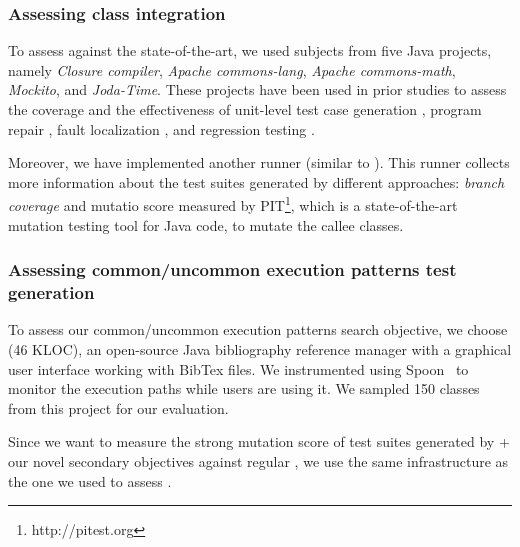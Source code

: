 \subsubsection{Assessing class integration} 
To assess \cling against the state-of-the-art, we used subjects from five Java projects, namely \textit{Closure compiler}, \textit{Apache commons-lang}, \textit{Apache commons-math}, \textit{Mockito}, and \textit{Joda-Time}. These 
projects have been used in prior studies to assess the coverage and the effectiveness of unit-level test case generation \cite{ma2015grt, Panichella2018, just2014defects4j, Shamshiri2016}, program repair \cite{smith2015cure, martinez2016astor}, fault localization \cite{pearson2017evaluating, b2016learning}, and regression testing \cite{noor2015similarity, lu2016does}.

Moreover, we have implemented another runner (similar to \exrunner). This runner collects more information about the test suites generated by different approaches: \textit{branch coverage} and mutatio score measured by PIT\footnote{http://pitest.org}, which is a state-of-the-art mutation testing tool for Java code, to mutate the callee classes.

\subsubsection{Assessing common/uncommon execution patterns test generation} 

To assess our common/uncommon execution patterns search objective, we choose \jabref (46 KLOC), an open-source Java bibliography reference manager with a graphical user interface working with BibTex files. We instrumented \jabref using Spoon~\cite{pawlak:hal-01078532} to monitor the execution paths while users are using it. We sampled 150 classes from this project for our evaluation.

Since we want to measure the strong mutation score of test suites generated by \evosuite + our novel secondary objectives against regular \evosuite, we use the same infrastructure as the one we used to assess \cling.